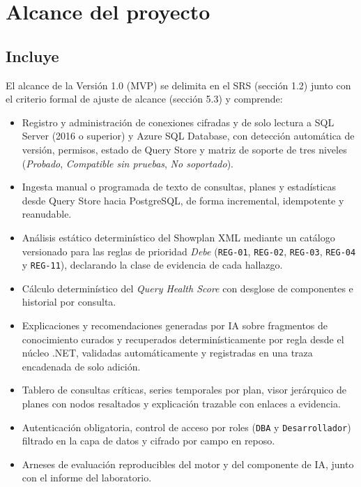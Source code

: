 \documentclass[12pt,a4paper]{article}
\begin{document}
\section{Alcance del proyecto}

\subsection{Incluye}

El alcance de la Versión 1.0 (MVP) se delimita en el SRS (sección 1.2) junto con el criterio formal de ajuste de alcance (sección 5.3) y comprende:

\begin{itemize}[leftmargin=1.5em]
    \item Registro y administración de conexiones cifradas y de solo lectura a SQL Server (2016 o superior) y Azure SQL Database, con detección automática de versión, permisos, estado de Query Store y matriz de soporte de tres niveles (\textit{Probado}, \textit{Compatible sin pruebas}, \textit{No soportado}).
    \item Ingesta manual o programada de texto de consultas, planes y estadísticas desde Query Store hacia PostgreSQL, de forma incremental, idempotente y reanudable.
    \item Análisis estático determinístico del Showplan XML mediante un catálogo versionado para las reglas de prioridad \textit{Debe} (\texttt{REG-01}, \texttt{REG-02}, \texttt{REG-03}, \texttt{REG-04} y \texttt{REG-11}), declarando la clase de evidencia de cada hallazgo.
    \item Cálculo determinístico del \textit{Query Health Score} con desglose de componentes e historial por consulta.
    \item Explicaciones y recomendaciones generadas por IA sobre fragmentos de conocimiento curados y recuperados determinísticamente por regla desde el núcleo .NET, validadas automáticamente y registradas en una traza encadenada de solo adición.
    \item Tablero de consultas críticas, series temporales por plan, visor jerárquico de planes con nodos resaltados y explicación trazable con enlaces a evidencia.
    \item Autenticación obligatoria, control de acceso por roles (\texttt{DBA} y \texttt{Desarrollador}) filtrado en la capa de datos y cifrado por campo en reposo.
    \item Arneses de evaluación reproducibles del motor y del componente de IA, junto con el informe del laboratorio.
\end{itemize}
\end{document}

